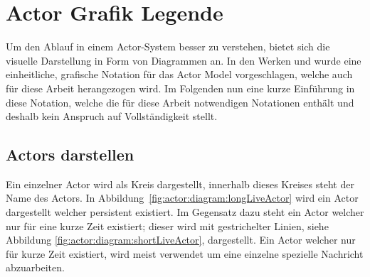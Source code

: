 \section{Actor Grafik Legende}\label{actor:diagram:description}
Um den Ablauf in einem Actor-System besser zu verstehen, bietet sich die visuelle Darstellung in Form von Diagrammen an. In den Werken \cite{kuhn2017reactive} und \cite{Vernon2015ReactiveAkka} wurde eine einheitliche, grafische Notation für das Actor Model vorgeschlagen, welche auch für diese Arbeit herangezogen wird. Im Folgenden nun eine kurze Einführung in diese Notation, welche die für diese Arbeit notwendigen Notationen enthält und deshalb kein Anspruch auf Vollständigkeit stellt.\\
\subsection{Actors darstellen}
Ein einzelner Actor wird als Kreis dargestellt, innerhalb dieses Kreises steht der Name des Actors. In Abbildung~\ref{fig:actor:diagram:longLiveActor} wird ein Actor dargestellt welcher persistent existiert. Im Gegensatz dazu steht ein Actor welcher nur für eine kurze Zeit existiert; dieser wird mit gestrichelter Linien, siehe Abbildung \ref{fig:actor:diagram:shortLiveActor}, dargestellt. Ein Actor welcher nur für kurze Zeit existiert, wird meist verwendet um eine einzelne spezielle Nachricht abzuarbeiten. 
